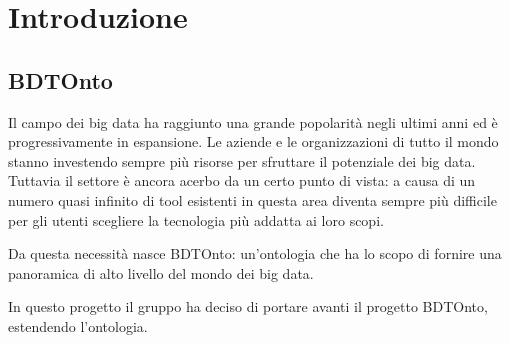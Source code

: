 \chapter{Introduzione}
\section{BDTOnto}

Il campo dei big data ha raggiunto una grande popolarità negli ultimi anni ed è progressivamente in espansione.
Le aziende e le organizzazioni di tutto il mondo stanno investendo sempre più risorse per sfruttare
il potenziale dei big data.
Tuttavia il settore è ancora acerbo da un certo punto di vista: a causa di un numero quasi infinito
di tool esistenti in questa area diventa sempre più difficile per gli utenti scegliere la tecnologia
più addatta ai loro scopi.

Da questa necessità nasce BDTOnto: un'ontologia che ha lo scopo di fornire una panoramica di alto livello
del mondo dei big data.

In questo progetto il gruppo ha deciso di portare avanti il progetto BDTOnto, estendendo l'ontologia.